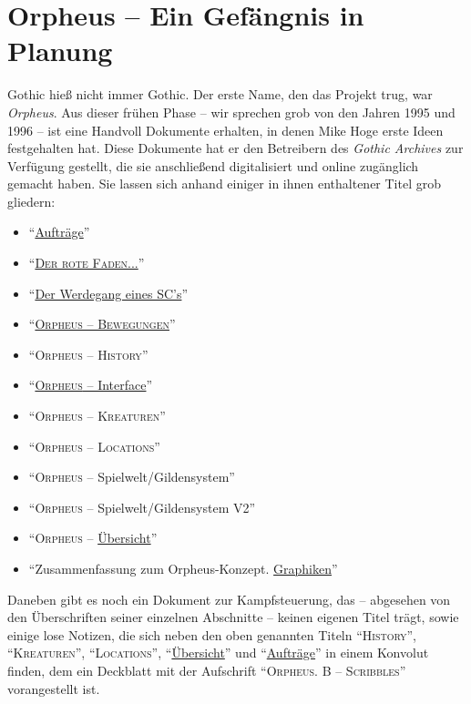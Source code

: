 \documentclass[a5paper,pagesize]{scrbook}
\begin{document}
\chapter{Orpheus -- Ein Gefängnis in Planung}\label{ch:orpheus}
Gothic hieß nicht immer Gothic.
Der erste Name, den das Projekt trug, war \textit{Orpheus}. %
Aus dieser frühen Phase -- wir sprechen grob von den Jahren 1995 und 1996 -- ist eine Handvoll Dokumente erhalten, in denen Mike Hoge erste Ideen festgehalten hat.
Diese Dokumente hat er den Betreibern des \textit{Gothic Archives} zur Verfügung gestellt, die sie anschließend digitalisiert und online zugänglich gemacht haben.\autocite[Vgl.][]{archive_orpheus_2024}
Sie lassen sich anhand einiger in ihnen enthaltener Titel grob gliedern:

\begin{itemize}
   \item \enquote{\uline{Aufträge}}\autocite[S.~16--17]{orpheus_b_scribbles}
   \item \enquote{\uline{\textsc{Der rote Faden...}}}\autocite{orpheus_der_rote}
   \item \enquote{\uline{Der Werdegang eines SC's}}\autocite{orpheus_der_werdegang}
   \item \enquote{\uline{\textsc{Orpheus -- Bewegungen}}}\autocite{orpheus_bewegungen}
   \item \enquote{\textsc{Orpheus -- History}}\autocite[S.~2--3]{orpheus_b_scribbles}
   \item \enquote{\uline{\textsc{Orpheus} -- Interface}}\autocite{orpheus_interface}
   \item \enquote{\textsc{Orpheus -- Kreaturen}}\autocite[S.~4]{orpheus_b_scribbles}
   \item \enquote{\textsc{Orpheus -- Locations}}\autocite[S.~5]{orpheus_b_scribbles}
   \item \enquote{\textsc{Orpheus} -- Spielwelt/Gildensystem}\autocite{orpheus_gildensystem}
   \item \enquote{\textsc{Orpheus} -- Spielwelt/Gildensystem V2}\autocite{orpheus_gildensystem_v2}
   \item \enquote{\textsc{Orpheus} -- \uline{Übersicht}}\autocite[S.~11--14]{orpheus_b_scribbles}
   \item \enquote{Zusammenfassung zum Orpheus-Konzept. \uline{Graphiken}}\autocite{orpheus_zusammenfassung_1996}
\end{itemize}

\noindent Daneben gibt es noch ein Dokument zur Kampfsteuerung,\autocite{orpheus_kampfsteuerung} das -- abgesehen von den Überschriften seiner einzelnen Abschnitte -- keinen eigenen Titel trägt, sowie einige lose Notizen, die sich neben den oben genannten Titeln \enquote{\textsc{History}}, \enquote{\textsc{Kreaturen}}, \enquote{\textsc{Locations}}, \enquote{\uline{Übersicht}} und \enquote{\uline{Aufträge}} in einem Konvolut finden, dem ein Deckblatt mit der Aufschrift \enquote{\textsc{Orpheus. B -- Scribbles}} vorangestellt ist.\autocite{orpheus_b_scribbles}
\end{document}
